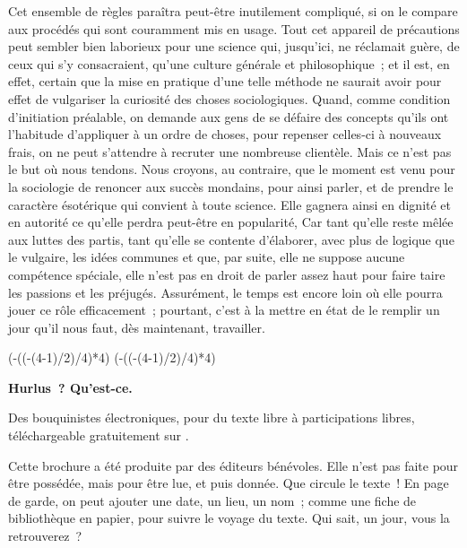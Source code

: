 \documentclass[french,twoside]{book} %
\newcommand\chapterclose{} %
\def\truncdiv#1#2{((#1-(#2-1)/2)/#2)}
\def\moduloop#1#2{(#1-\truncdiv{#1}{#2}*#2)}
\def\modulo#1#2{\number\numexpr\moduloop{#1}{#2}\relax}
\begin{document}
Cet ensemble de règles paraîtra peut-être inutilement compliqué, si on le compare aux procédés qui sont couramment mis en usage. Tout cet appareil de précautions peut sembler bien laborieux pour une science qui, jusqu’ici, ne réclamait guère, de ceux qui s’y consacraient, qu’une culture générale et philosophique ; et il est, en effet, certain que la mise en pratique d’une telle méthode ne saurait avoir pour effet de vulgariser la curiosité des choses sociologiques. Quand, comme condition d’initiation préalable, on demande aux gens de se défaire des concepts qu’ils ont l’habitude d’appliquer à un ordre de choses, pour repenser celles-ci à nouveaux frais, on ne peut s’attendre à recruter une nombreuse clientèle. Mais ce n’est pas le but où nous tendons. Nous croyons, au contraire, que le moment est venu pour la sociologie de renoncer aux succès mondains, pour ainsi parler, et de prendre le caractère ésotérique qui convient à toute science. Elle gagnera ainsi en dignité et en autorité ce qu’elle perdra peut-être en popularité, Car tant qu’elle reste mêlée aux luttes des partis, tant qu’elle se contente d’élaborer, avec plus de logique que le vulgaire, les idées communes et que, par suite, elle ne suppose aucune compétence spéciale, elle n’est pas en droit de parler assez haut pour faire taire les passions et les préjugés. Assurément, le temps est encore loin où elle pourra jouer ce rôle efficacement ; pourtant, c’est à la mettre en état de le remplir un jour qu’il nous faut, dès maintenant, travailler.
\chapterclose

 


\ifbooklet
  \pagestyle{empty}
  \clearpage
  \ifnum\modulo{\value{page}}{4}=0 \hbox{}\newpage\hbox{}\newpage\fi
  \ifnum\modulo{\value{page}}{4}=1 \hbox{}\newpage\hbox{}\newpage\fi


  \hbox{}\newpage
  \ifodd\value{page}\hbox{}\newpage\fi
  {\centering\color{rubric}\bfseries\noindent\large
    Hurlus ? Qu’est-ce.\par
    \bigskip
  }
  \noindent Des bouquinistes électroniques, pour du texte libre à participations libres,
  téléchargeable gratuitement sur \href{https://hurlus.fr}{}.\par
  \bigskip
  \noindent Cette brochure a été produite par des éditeurs bénévoles.
  Elle n’est pas faite pour être possédée, mais pour être lue, et puis donnée.
  Que circule le texte !
  En page de garde, on peut ajouter une date, un lieu, un nom ;
  comme une fiche de bibliothèque en papier,
  pour suivre le voyage du texte. Qui sait, un jour, vous la retrouverez ?
  \par
\end{document}
